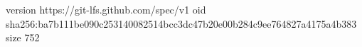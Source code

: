 version https://git-lfs.github.com/spec/v1
oid sha256:ba7b111be090c253140082514bcc3dc47b20e00b284c9ee764827a4175a4b383
size 752
